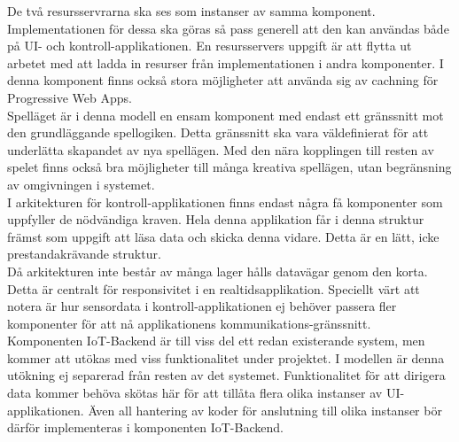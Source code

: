 De två resursservrarna ska ses som instanser av samma komponent. Implementationen för dessa ska göras så pass generell att den kan användas både på UI- och kontroll-applikationen. En resursservers uppgift är att flytta ut arbetet med att ladda in resurser från implementationen i andra komponenter. I denna komponent finns också stora möjligheter att använda sig av cachning för Progressive Web Apps.\\

Spelläget är i denna modell en ensam komponent med endast ett gränssnitt mot den grundläggande spellogiken. Detta gränssnitt ska vara väldefinierat för att underlätta skapandet av nya spellägen. Med den nära kopplingen till resten av spelet finns också bra möjligheter till många kreativa spellägen, utan begränsning av omgivningen i systemet.\\

I arkitekturen för kontroll-applikationen finns endast några få komponenter som uppfyller de nödvändiga kraven. Hela denna applikation får i denna struktur främst som uppgift att läsa data och skicka denna vidare. Detta är en lätt, icke prestandakrävande struktur.\\

Då arkitekturen inte består av många lager hålls datavägar genom den korta. Detta är centralt för responsivitet i en realtidsapplikation. Speciellt värt att notera är hur sensordata i kontroll-applikationen ej behöver passera fler komponenter för att nå applikationens kommunikations-gränssnitt.\\

Komponenten IoT-Backend är till viss del ett redan existerande system, men kommer att utökas med viss funktionalitet under projektet. I modellen är denna utökning ej separerad från resten av det systemet. Funktionalitet för att dirigera data kommer behöva skötas här för att tillåta flera olika instanser av UI-applikationen. Även all hantering av koder för anslutning till olika instanser bör därför implementeras i komponenten IoT-Backend.\\
